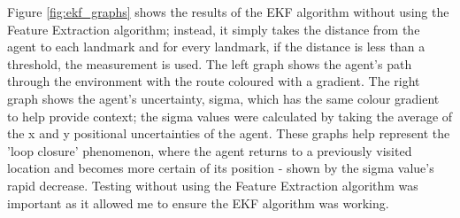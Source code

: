 \documentclass[12pt]{article}
\begin{document}
Figure \ref{fig:ekf_graphs} shows the results of the EKF algorithm without using the Feature Extraction algorithm; instead, it simply takes
the distance from the agent to each landmark and for every landmark, if the distance is less than a threshold, the measurement is used.
The left graph shows the agent's path through the environment with the route coloured with a gradient. The right graph shows the agent's
uncertainty, sigma, which has the same colour gradient to help provide context; the sigma values were calculated by taking the average of
the x and y positional uncertainties of the agent. These graphs help represent the 'loop closure' phenomenon, where the agent returns to a
previously visited location and becomes more certain of its position - shown by the sigma value's rapid decrease. Testing without using the
Feature Extraction algorithm was important as it allowed me to ensure the EKF algorithm was working.\\
\end{document}
